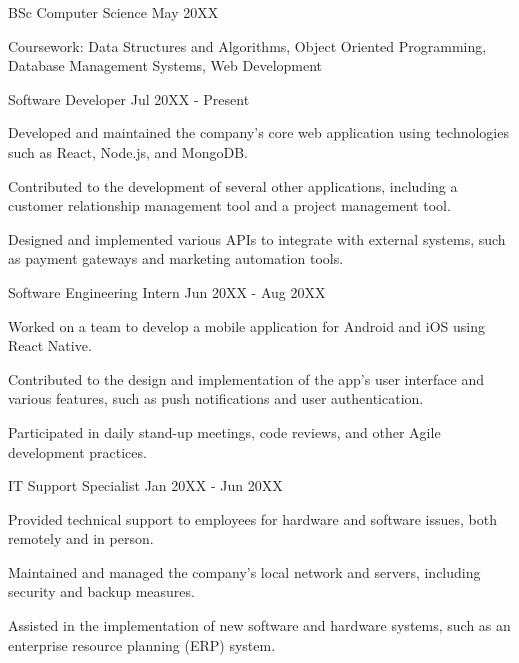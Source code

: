 
\begin{cv}

\begin{cveducation}%
    \cvdegree
        {BSc Computer Science}
        {May 20XX}
        \begin{cvdescription}
            \item Coursework: Data Structures and Algorithms, Object Oriented Programming, Database Management Systems, Web Development
        \end{cvdescription}
\end{cveducation}

\begin{cvexperience}
    \cvposition
        {Software Developer}
        {Jul 20XX - Present}
        \begin{cvdescription}
            \item Developed and maintained the company's core web application using technologies such as React, Node.js, and MongoDB.
            \item Contributed to the development of several other applications, including a customer relationship management tool and a project management tool.
            \item Designed and implemented various APIs to integrate with external systems, such as payment gateways and marketing automation tools.
        \end{cvdescription}

    \cvposition
        {Software Engineering Intern}
        {Jun 20XX - Aug 20XX}
        \begin{cvdescription}
            \item Worked on a team to develop a mobile application for Android and iOS using React Native.
            \item Contributed to the design and implementation of the app's user interface and various features, such as push notifications and user authentication.
            \item Participated in daily stand-up meetings, code reviews, and other Agile development practices.
        \end{cvdescription}

    \cvposition
        {IT Support Specialist}
        {Jan 20XX - Jun 20XX}
        \begin{cvdescription}
            \item Provided technical support to employees for hardware and software issues, both remotely and in person.
            \item Maintained and managed the company's local network and servers, including security and backup measures.
            \item Assisted in the implementation of new software and hardware systems, such as an enterprise resource planning (ERP) system.
        \end{cvdescription}
\end{cvexperience}


\end{cv}
